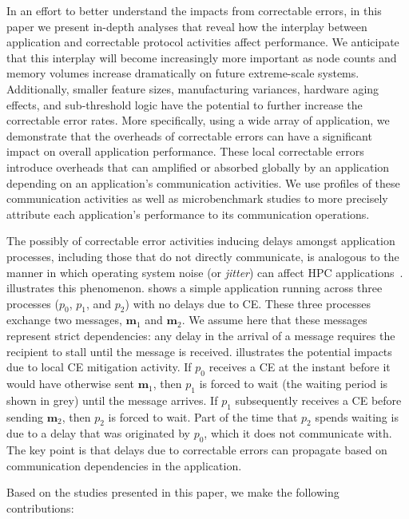 In an effort to better understand the impacts from correctable errors, in this
paper we present in-depth analyses that reveal how the interplay between
application and correctable protocol activities affect performance.  We
anticipate that this interplay will become increasingly more important as node
counts and memory volumes increase dramatically on future extreme-scale systems.
Additionally, smaller feature sizes, manufacturing variances, hardware aging
effects, and sub-threshold logic have the potential to further increase the
correctable error rates.  More specifically, using a wide array of application,
we demonstrate that the overheads of correctable errors can have a significant
impact on overall application performance.  These local correctable errors
introduce overheads that can amplified or absorbed globally by an application
depending on an application's communication activities.  We use profiles of
these communication activities as well as microbenchmark studies to more
precisely attribute each application's performance to its communication
operations.

The possibly of correctable error activities inducing delays amongst application
processes, including those that do not directly communicate, is analogous to
the manner in which operating system noise (or \emph{jitter}) can affect HPC
applications~\cite{Hoefler:2010:Characterizing, Ferreira:08:characterizing}.
 illustrates this phenomenon.   shows
a simple application running across three processes ($p_0$, $p_1$, and $p_2$)
with no delays due to CE.  These three processes exchange two messages,
$\mathbf{m}_1$ and $\mathbf{m}_2$.  We assume here that these messages represent
strict dependencies: any delay in the arrival of a message requires the
recipient to stall until the message is received. 
illustrates the potential impacts due to local CE mitigation activity.  If $p_0$
receives a CE at the instant before it would have otherwise sent $\mathbf{m}_1$,
then $p_1$ is forced to wait (the waiting period is shown in grey) until the
message arrives.  If $p_1$ subsequently receives a CE before sending
$\mathbf{m}_2$, then $p_2$ is forced to wait.  Part of the time that $p_2$
spends waiting is due to a delay that was originated by $p_0$, which it does not
communicate with.  The key point is that delays due to correctable errors can
propagate based on communication dependencies in the application.

Based on the studies presented in this paper, we make the following
contributions:

